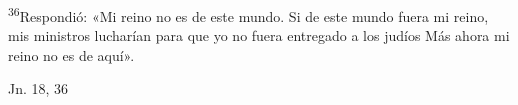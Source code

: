 \documentclass[../../rosario.tex]{subfiles}
\begin{document}
    \textsuperscript{36}Respondió: «Mi reino no es de este mundo. Si de este mundo fuera mi reino, mis ministros lucharían para que yo no fuera entregado a los judíos
    Más ahora mi reino no es de aquí».
    \begin{flushright}
    Jn. 18, 36
    \end{flushright}
\end{document}
